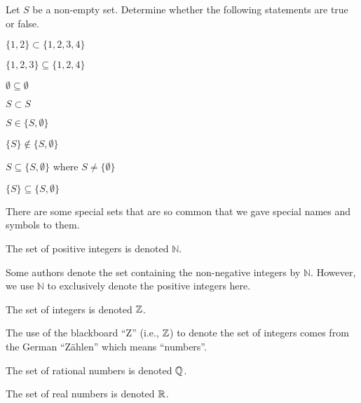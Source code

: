 \begin{exercise}
    Let $S$ be a non-empty set. Determine whether the following statements are true or false.
    \begin{multicols}{2}
        \begin{partquestions}{\alph*}
            \item $\{1, 2\} \subset \{1, 2, 3, 4\}$
            \item $\{1, 2, 3\} \subseteq \{1, 2, 4\}$
            \item $\emptyset \subseteq \emptyset$
            \item $S \subset S$
            \item $S \in \{S, \emptyset\}$
            \item $\{S\} \notin \{S, \emptyset\}$
            \item $S \subseteq \{S, \emptyset\}$ where $S \neq \{\emptyset\}$
            \item $\{S\} \subseteq \{S, \emptyset\}$
        \end{partquestions}
    \end{multicols}
\end{exercise}

There are some special sets that are so common that we gave special names and symbols to them.
\begin{definition}
    The set of positive integers is denoted $\mathbb{N}$.
\end{definition}
\begin{remark}
    Some authors denote the set containing the non-negative integers by $\mathbb{N}$. However, we use $\mathbb{N}$ to exclusively denote the positive integers here.
\end{remark}

\begin{definition}
    The set of integers  is denoted $\mathbb{Z}$.
\end{definition}
\begin{remark}
    The use of the blackboard ``Z'' (i.e., $\mathbb{Z}$) to denote the set of integers comes from the German ``Z\"ahlen'' which means ``numbers''.
\end{remark}

\begin{definition}
    The set of rational numbers is denoted $\mathbb{Q}$.
\end{definition}

\begin{definition}
    The set of real numbers is denoted $\mathbb{R}$.
\end{definition}

